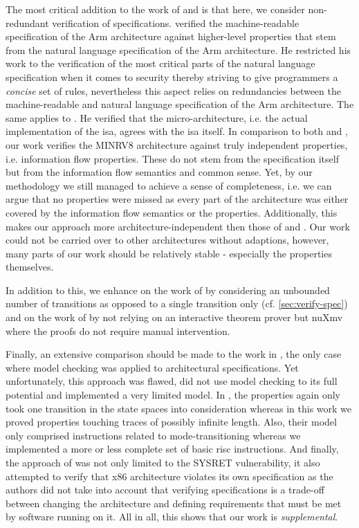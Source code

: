 The most critical addition to the work of \cite{Reid17} and \cite{Fox02} is that here, we consider non-redundant verification of specifications.
\cite{Reid17} verified the machine-readable specification of the Arm architecture against higher-level properties that stem from the natural language specification of the Arm architecture.
He restricted his work to the verification of the most critical parts of the natural language specification when it comes to security thereby striving to give programmers a \textit{concise} set of rules, nevertheless this aspect relies on redundancies between the machine-readable and natural language specification of the Arm architecture.
The same applies to \cite{Fox02}.
He verified that the micro-architecture, i.e. the actual implementation of the \gls{isa}, agrees with the \gls{isa} itself.
In comparison to both \cite{Reid17} and \cite{Fox02}, our work verifies the MINRV8 architecture against truly independent properties, i.e. information flow properties.
These do not stem from the specification itself but from the information flow semantics and common sense.
Yet, by our methodology we still managed to achieve a sense of completeness, i.e. we can argue that no properties were missed as every part of the architecture was either covered by the information flow semantics or the properties.
Additionally, this makes our approach more architecture-independent then those of \cite{Reid17} and \cite{Fox02}.
Our work could not be carried over to other architectures without adaptions, however, many parts of our work should be relatively stable - especially the properties themselves.

In addition to this, we enhance on the work of \cite{Reid17} by considering an unbounded number of transitions as opposed to a single transition only (cf. \ref{sec:verify-spec}) and on the work of \cite{Fox02} by not relying on an interactive theorem prover but nuXmv where the proofs do not require manual intervention.

Finally, an extensive comparison should be made to the work in \cite{BradfieldS16}, the only case where model checking was applied to architectural specifications.
Yet unfortunately, this approach was flawed, did not use model checking to its full potential and implemented a very limited model.
In \cite{BradfieldS16}, the properties again only took one transition in the state spaces into consideration whereas in this work we proved properties touching traces of possibly infinite length.
Also, their model only comprised instructions related to mode-transitioning whereas we implemented a more or less complete set of basic \gls{risc} instructions.
And finally, the approach of \cite{BradfieldS16} was not only limited to the SYSRET vulnerability, it also attempted to verify that x86 architecture violates its own specification as the authors did not take into account that verifying specifications is a trade-off between changing the architecture and defining requirements that must be met by software running on it.
All in all, this shows that our work is \textit{supplemental}.
